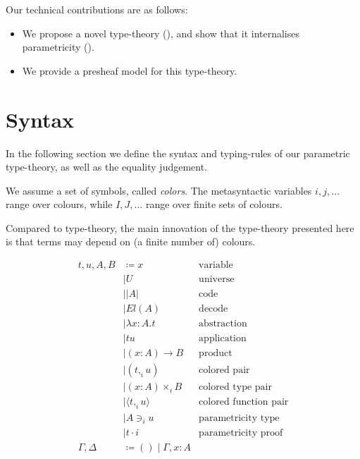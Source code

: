 \documentclass[english]{PaperTools/latex/lipics}
\newcommand\CP[3]{(#2,_{#1} #3)}
\newcommand\CTimes[2]{(#2) ×_{#1}}
\newcommand\param[1]{\!\cdot\!#1}
\newcommand\op[1]{∋_{#1}}
\newcommand\fp[3]{⟨#2 ,_{#1} #3⟩}
\newcommand\comment[1]{}
\begin{document}
Our technical contributions are as follows:
\begin{itemize}
\item We propose a novel type-theory (), and show
  that it internalises parametricity ().
\item We provide a presheaf model for this type-theory. 
\end{itemize}

\section{Syntax}
\label{sec:syntax}
In the following section we define the syntax and typing-rules of our
parametric type-theory, as well as the equality judgement.

We assume a set of symbols, called \emph{colors}.
The metasyntactic variables $i,j,\ldots$ range over colours, while
$I,J,…$ range over finite sets of colours.

Compared to type-theory, the main innovation of the type-theory
presented here is that terms may depend on (a finite number of)
colours.
\begin{definition}
  \begin{align*}
    t,u,A,B & \coloneqq x & \text {variable} \\
            & \mid U & \text{universe} \\ 
            & \mid |A| & \text{code} \\ 
            & \mid El(A) & \text{decode} \\ 
            & \mid λx:A. t & \text{abstraction} \\
            & \mid t u & \text{application} \\ 
            & \mid (x:A) → B & \text{product} \\
            & \mid \CP i t u & \text{colored pair} \\
            & \mid \CTimes i {x:A} B  & \text{colored type pair} \\
            & \mid \fp i t u & \text{colored function pair}\\
            & \mid A \op i u & \text{parametricity type} \\
            & \mid t \param i & \text{parametricity proof} \\
    \Gamma,\Delta & \coloneqq () \mid \Gamma,x:A
  \end{align*}
\end{definition}
\end{document}

